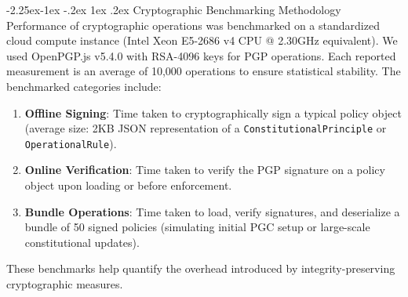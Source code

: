 \documentclass[manuscript,screen,review,anonymous,9pt]{acmart}
\makeatletter
\renewcommand\subsection{\@startsection{subsection}{2}{\z@}%
  {-2.25ex\@plus -1ex \@minus -.2ex}%
  {1ex \@plus .2ex}%
  {\normalfont\large\bfseries}}
\makeatother
\begin{document}
\subsection{Cryptographic Benchmarking Methodology}
Performance of cryptographic operations was benchmarked on a standardized cloud compute instance (Intel Xeon E5-2686 v4 CPU @ 2.30GHz equivalent). We used OpenPGP.js v5.4.0 with RSA-4096 keys for PGP operations. Each reported measurement is an average of 10,000 operations to ensure statistical stability. The benchmarked categories include:
\begin{enumerate}[leftmargin=*,itemsep=1pt,parsep=1pt]
    \item \textbf{Offline Signing}: Time taken to cryptographically sign a typical policy object (average size: 2KB JSON representation of a \texttt{ConstitutionalPrinciple} or \texttt{OperationalRule}).
    \item \textbf{Online Verification}: Time taken to verify the PGP signature on a policy object upon loading or before enforcement.
    \item \textbf{Bundle Operations}: Time taken to load, verify signatures, and deserialize a bundle of 50 signed policies (simulating initial PGC setup or large-scale constitutional updates).
\end{enumerate}
These benchmarks help quantify the overhead introduced by integrity-preserving cryptographic measures.
\end{document}
